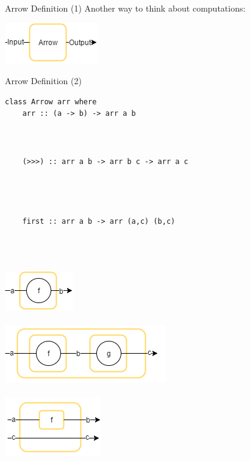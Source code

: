\begin{frame}[fragile]{Arrow Definition (1)}
\centering Another way to think about computations:
\begin{center}
	\includegraphics[scale=0.8]{images/arrow}~\\
\end{center}
\end{frame}

\begin{frame}[fragile]{Arrow Definition (2)}
\begin{minipage}{0.6\textwidth}
\begin{lstlisting}[frame=htrbl, numbers=none]
class Arrow arr where
	arr :: (a -> b) -> arr a b
	
	
	
	(>>>) :: arr a b -> arr b c -> arr a c
	
	
	
	
	first :: arr a b -> arr (a,c) (b,c)
\end{lstlisting}
\vfill
\end{minipage}
\hspace*{0.03\textwidth}
\begin{minipage}{0.25\textwidth}
	~\\~\\~\\
	\includegraphics[scale=0.6]{images/arr}~\\~\\
	\includegraphics[scale=0.6]{images/compose}~\\~\\
	\includegraphics[scale=0.6]{images/first}~\\~\\
\end{minipage}
\end{frame}

